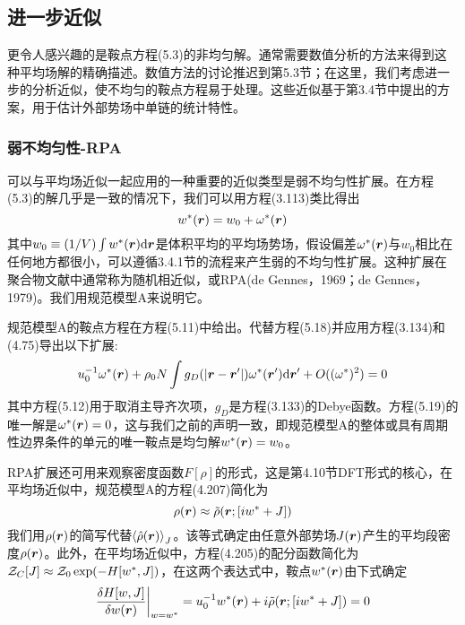 \subsection{进一步近似}
更令人感兴趣的是鞍点方程(5.3)的非均匀解。通常需要数值分析的方法来得到这种平均场解的精确描述。数值方法的讨论推迟到第5.3节；在这里，我们考虑进一步的分析近似，使不均匀的鞍点方程易于处理。这些近似基于第3.4节中提出的方案，用于估计外部势场中单链的统计特性。
\subsubsection{弱不均匀性-RPA}
可以与平均场近似一起应用的一种重要的近似类型是弱不均匀性扩展。在方程(5.3)的解几乎是一致的情况下，我们可以用方程(3.113)类比得出
\begin{equation}
w^*(\bm{r})=w_0+\omega^*(\bm{r})
\end{equation}
其中$w_0\equiv(1/V)\int w^*(\bm{r})\mathrm{d}\bm{r}$是体积平均的平均场势场，假设偏差$\omega^*(\bm{r})$与$w_0$相比在任何地方都很小，可以遵循3.4.1节的流程来产生弱的不均匀性扩展。这种扩展在聚合物文献中通常称为随机相近似，或RPA(de Gennes，1969；de Gennes，1979)。我们用规范模型A来说明它。

规范模型A的鞍点方程在方程(5.11)中给出。代替方程(5.18)并应用方程(3.134)和(4.75)导出以下扩展:
\begin{equation}
u_0^{-1}\omega^*(\bm{r})+\rho_0N\int g_D(\left|\bm{r}-\bm{r}'\right|)\omega^*(\bm{r}')\mathrm{d}\bm{r}'+O((\omega^*)^2)=0
\end{equation}
其中方程(5.12)用于取消主导齐次项，$g_D$是方程(3.133)的Debye函数。方程(5.19)的唯一解是$\omega^*(\bm{r})=0$，这与我们之前的声明一致，即规范模型A的整体或具有周期性边界条件的单元的唯一鞍点是均匀解$w^*(\bm{r})=w_0$。

RPA扩展还可用来观察密度函数$F[\rho]$的形式，这是第4.10节DFT形式的核心，在平均场近似中，规范模型A的方程(4.207)简化为
\begin{equation}
\rho(\bm{r})\approx\tilde{\rho}(\bm{r};[iw^*+J])
\end{equation}
我们用$\rho(\bm{r})$的简写代替$\left\langle\hat{\rho}(\bm{r})\right\rangle_J$。该等式确定由任意外部势场$J(\bm{r})$产生的平均段密度$\rho(\bm{r})$。此外，在平均场近似中，方程(4.205)的配分函数简化为$\mathcal{Z}_C[J]\approx\mathcal{Z}_0\exp(-H[w^*,J])$，在这两个表达式中，鞍点$w^*(\bm{r})$由下式确定
\begin{equation}
\frac{\delta H[w,J]}{\delta w(\bm{r})}\bigg|_{w=w^*}=u_0^{-1}w^*(\bm{r})+i\tilde{\rho}(\bm{r};[iw^*+J])=0
\end{equation}
































